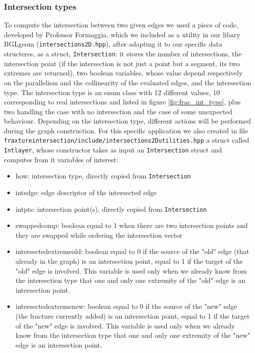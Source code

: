 \documentclass[11pt]{article} %
\begin{document}
		\subsubsection{Intersection types}
		To compute the intersection between two given edges we used a piece of code, developed by Professor Formaggia, which we included as a utility in our libary BGLgeom (\texttt{intersections2D.hpp}), after adapting it to our specific data structeres, as a struct, \texttt{Intersection}: it stores the number of intersections, the intersection point (if the intersection is not just a point but a segment, its two extremes are returned), two boolean variables, whose value depend respectively on the parallelism and the collinearity of the evaluated edges, and the intersection type.\newline
		The intersection type is an enum class with 12 different values, 10 corresponding to real intersections and listed in figure \ref{fig:frac_int_type}, plus two handling the case with no intersection and the case of some unexpected behaviour.
		Depending on the intersection type, different actions will be performed during the graph construction.
		For this specific application we also created in file \texttt{fraxture\textunderscore intersection/include/intersections2D\textunderscore utilities.hpp} a struct called \texttt{Int\textunderscore layer}, whose constructor takes as input an \texttt{Intersection} struct and computes from it variables of interest:
		\begin{itemize}
			\item how: intersection type, directly copied from \texttt{Intersection}
			\item int\textunderscore edge: edge descriptor of the intersected edge
			\item int\textunderscore pts: intersection point(s), directly copied from \texttt{Intersection}
			\item swapped\textunderscore comp: boolean equal to 1 when there are two intersection points and they are swapped while ordering the intersection vector
			\item intersected\textunderscore extreme\textunderscore old: boolean equal to 0 if the source of the "old" edge (that already in the graph) is an intersection point, equal to 1 if the target of the "old" edge is involved. This variable is used only when we already know from the intersection type that one and only one extremity of the "old" edge is an intersection point.
			\item intersected\textunderscore extreme\textunderscore new: boolean equal to 0 if the source of the "new" edge (the fracture currently added) is an intersection point, equal to 1 if the target of the "new" edge is involved. This variable is used only when we already know from the intersection type that one and only one extremity of the "new" edge is an intersection point.
		\end{itemize}
		
\end{document}
